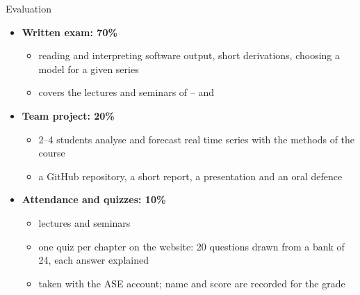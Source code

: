 \begin{frame}{Evaluation}
\itemsize{\small}
\begin{itemize}
    \item \textbf{Written exam: 70\%}
    \begin{itemize}
        \item reading and interpreting software output, short derivations, choosing a model for a given series
        \item covers the lectures and seminars of -- and 
    \end{itemize}
    \item \textbf{Team project: 20\%}
    \begin{itemize}
        \item 2--4 students analyse and forecast real time series with the methods of the course
        \item a GitHub repository, a short report, a presentation and an oral defence
    \end{itemize}
    \item \textbf{Attendance and quizzes: 10\%}
    \begin{itemize}
        \item lectures and seminars
        \item one quiz per chapter on the website: 20 questions drawn from a bank of 24, each answer explained
        \item taken with the ASE account; name and score are recorded for the grade
    \end{itemize}
\end{itemize}
\end{frame}

